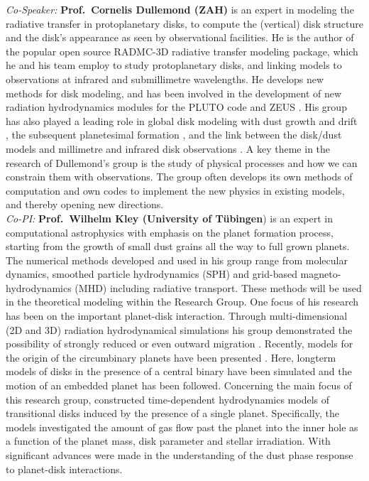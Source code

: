 \documentclass[10pt,fleqn,twoside]{article}
\begin{document}
{\it Co-Speaker:} {\bf Prof.\ Cornelis Dullemond (ZAH)} is an expert in modeling the radiative transfer in protoplanetary
disks, to compute the (vertical) disk structure and the disk's appearance as seen
by observational facilities. He is the author of the popular open source RADMC-3D 
radiative transfer modeling package, which he and his team employ to study
protoplanetary disks, and linking models to observations at infrared and submillimetre
wavelengths. He develops new methods for disk modeling, and has been involved
in the development of new radiation hydrodynamics modules for the PLUTO code
\citep{2010A&A...511A..81K} and ZEUS \citep{2015A&A...574A..81R}. His group has also played a
leading role in global disk modeling with dust growth and drift 
\citep[e.g.,][]{2008A&A...480..859B, 2008A&A...489..931Z, 2010A&A...513A..56G,
2010A&A...513A..57Z, 2009A&A...503L...5B, 2010A&A...513A..79B}, 
the subsequent planetesimal formation 
\citep[e.g.,][]{2010Icar..210..507O, 2012A&A...544L..16W, 2014A&A...572A..78D}, 
and the link between the disk/dust models and millimetre
and infrared disk observations 
\citep[e.g.,][]{2012A&A...538A.114P, 2013Sci...340.1199V,
2016ApJ...820...54K, 2016ApJ...831L..12K}. 
A key theme in the research of Dullemond's group is the study 
of physical processes and how we can constrain them with observations. The
group often develops its own methods of computation and own codes to implement
the new physics in existing models, and thereby opening new
directions. \\

{\it Co-PI:} {\bf Prof.\ Wilhelm Kley (University of T\"ubingen}) is an expert in computational astrophysics with emphasis on the
planet formation process, starting from the growth of small dust grains all the way
to full grown planets. The numerical methods developed and used in his group range 
from molecular dynamics, smoothed particle hydrodynamics (SPH) and grid-based 
magneto-hydrodynamics (MHD) including radiative transport. These methods will be used
in the theoretical modeling within the Research Group.   
One focus of his research has been on the important planet-disk
interaction. Through multi-dimensional (2D and 3D) radiation hydrodynamical simulations
his group demonstrated the possibility of strongly reduced or even outward migration
\citep{2008A&A...487L...9K, 2009A&A...506..971K}. Recently, models for the origin of the
circumbinary planets have been presented \citep{2014A&A...564A..72K}. Here, longterm models of
disks in the presence of a central binary have been simulated and the motion of an embedded
planet has been followed. Concerning the main focus of this research group, 
\citet{2013A&A...560A..40M} constructed time-dependent hydrodynamics models of transitional disks induced by the
presence of a single planet. Specifically, the models investigated the amount of gas flow past
the planet into the inner hole as a function of the planet mass, disk
parameter and stellar irradiation. With \citet{2015A&A...584A.110P}
significant advances were made in the understanding of the dust phase
response to planet-disk interactions. \\
\end{document}
